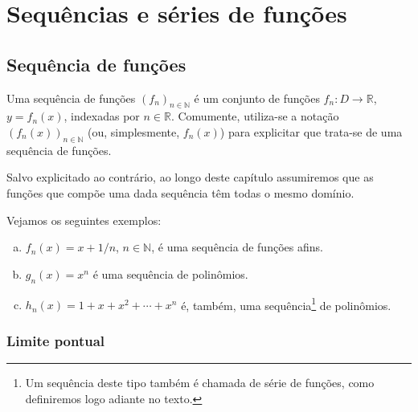 
\chapter{Sequências e séries de funções}\label{cap:sequências_e_séries_de_funções}
\thispagestyle{fancy}

\section{Sequência de funções}

\begin{defn}
  Uma sequência de funções $(f_n)_{n\in\mathbb{N}}$ é um conjunto de funções $f_n:D\to\mathbb{R}$, $y=f_n(x)$, indexadas por $n\in\mathbb{R}$. Comumente, utiliza-se a notação $(f_n(x))_{n\in\mathbb{N}}$ (ou, simplesmente, $f_n(x)$) para explicitar que trata-se de uma sequência de funções.
\end{defn}

\begin{obs}
  Salvo explicitado ao contrário, ao longo deste capítulo assumiremos que as funções que compõe uma dada sequência têm todas o mesmo domínio.
\end{obs}

\begin{ex}
  Vejamos os seguintes exemplos:
  \begin{enumerate}[a)]
  \item $f_n(x) = x+1/n$, $n\in\mathbb{N}$, é uma sequência de funções afins.
  \item $g_n(x) = x^n$ é uma sequência de polinômios.
  \item $h_n(x) = 1 + x + x^2 + \cdots + x^n$ é, também, uma sequência\footnote{Um sequência deste tipo também é chamada de série de funções, como definiremos logo adiante no texto.} de polinômios.
  \end{enumerate}
\end{ex}

\subsection{Limite pontual}

